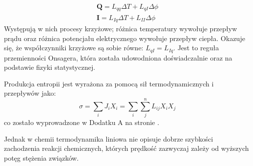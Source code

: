 \documentclass[10pt, a4paper, twoside, onecolumn]{article}
\numberwithin{equation}{section}
\begin{document}
	\begin{gather}
		\boldsymbol{Q}=L_{qq}\Delta T+L_{qI}\Delta \phi \\
		\boldsymbol{I}=L_{Iq}\Delta T+L_{II}\Delta \phi
	\end{gather}\cite{Ceynowa2008}
	Występują w nich procesy krzyżowe; różnica temperatury wywołuje przepływ prądu oraz różnica potencjału elektrycznego wywołuje przepływ ciepła.
	Okazuje się, że współczynniki krzyżowe są sobie równe: \(L_{qI}=L_{Iq}\). Jest to reguła przemienności Onsagera, która została udowodniona doświadczalnie oraz na podstawie fizyki statystycznej. \par
	Produkcja entropii jest wyrażona za pomocą sił termodynamicznych i przepływów jako: 
	\begin{equation}
		\sigma = \sum_{i}J_{i}X_{i} = \sum_{i}\sum_{j}^{n}L_{ij}X_{i}X_{j}
	\end{equation}
	co zostało wyprowadzone w Dodatku A na stronie \pageref{sec: dodatek A}. \par
	
	Jednak w chemii termodynamika liniowa nie opisuje dobrze szybkości zachodzenia reakcji chemicznych, których prędkość zazwyczaj zależy od wyższych potęg stężenia związków. \par
	
\end{document}
